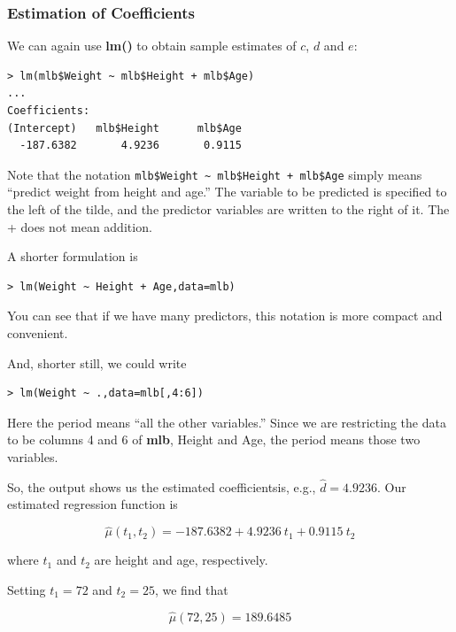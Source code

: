 \subsubsection{Estimation of Coefficients}
\label{estcoeffs}

We can again use {\bf lm()} to obtain sample estimates of $c$, $d$ and
$e$:

\begin{lstlisting}
> lm(mlb$Weight ~ mlb$Height + mlb$Age)
...
Coefficients:
(Intercept)   mlb$Height      mlb$Age  
  -187.6382       4.9236       0.9115  
\end{lstlisting}

Note that the notation \lstinline{mlb$Weight ~ mlb$Height + mlb$Age}
simply means ``predict weight from height and age.''  The
variable to be predicted is specified to the left of the tilde, and the
predictor variables are written to the right of it.  The + does not mean
addition.

A shorter formulation is 

\begin{lstlisting}
> lm(Weight ~ Height + Age,data=mlb)
\end{lstlisting}

You can see that if we have many predictors, this notation is more
compact and convenient.

And, shorter still, we could write

\begin{lstlisting}
> lm(Weight ~ .,data=mlb[,4:6])
\end{lstlisting}

Here the period means ``all the other variables.''  Since we are
restricting the data to be columns 4 and 6 of {\bf mlb}, Height and Age,
the period means those two variables.

So, the output shows us the estimated coefficientsis, e.g., $\widehat{d}
= 4.9236$.  Our estimated regression function is

\begin{equation}
\label{baseballlinest}
\widehat{\mu}(t_1,t_2) = -187.6382 + 4.9236 ~ t_1 + 0.9115 ~ t_2
\end{equation}

where $t_1$ and $t_2$ are height and age, respectively.

Setting $t_1 = 72$ and $t_2 = 25$, we find that 

\begin{equation}
\widehat{\mu}(72,25) = 189.6485
\end{equation}

